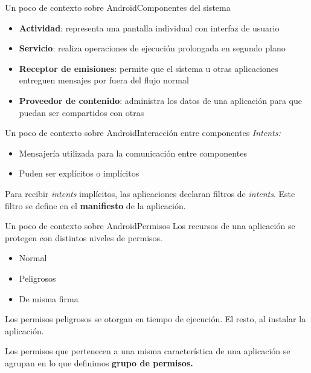 \documentclass[pdf]{beamer} %
\begin{document}
\begin{frame}{Un poco de contexto sobre Android}{Componentes del sistema}
    \begin{itemize}[<+->]
        \item \textbf{Actividad}: representa una pantalla individual con interfaz de usuario
        \item \textbf{Servicio}: realiza operaciones de ejecución prolongada en segundo plano
        \item \textbf{Receptor de emisiones}: permite que el sistema u otras aplicaciones entreguen
              mensajes por fuera del flujo normal
        \item \textbf{Proveedor de contenido}: administra los datos de una aplicación para que
              puedan ser compartidos con otras
    \end{itemize}
\end{frame}

\begin{frame}{Un poco de contexto sobre Android}{Interacción entre componentes}
    \textit{Intents:} \\
    \begin{itemize}
        \item Mensajería utilizada para la comunicación entre componentes \pause
        \item Puden ser explícitos o implícitos
    \end{itemize}
    \vspace{20px} \pause
    Para recibir \textit{intents} implícitos, las aplicaciones declaran filtros de \textit{intents}.
    Este filtro se define en el \textbf{manifiesto} de la aplicación.
\end{frame}

\begin{frame}{Un poco de contexto sobre Android}{Permisos}
    Los recursos de una aplicación se protegen con distintos niveles de permisos.
    \begin{itemize}[<+->]
        \item Normal
        \item Peligrosos
        \item De misma firma
    \end{itemize}
    \vspace{20px} \pause Los permisos peligrosos se  otorgan en tiempo de ejecución. El resto, al
    instalar la aplicación.

    \vspace{20px} \pause Los permisos que pertenecen a una misma característica de una aplicación
    se agrupan en lo que definimos \textbf{grupo de permisos.}
\end{frame}
\end{document}
